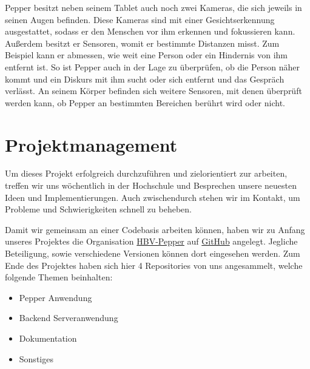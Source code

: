 Pepper besitzt neben seinem Tablet auch noch zwei Kameras, die sich jeweils in seinen Augen befinden. Diese Kameras sind mit einer Gesichtserkennung ausgestattet, sodass er den Menschen vor ihm erkennen und fokussieren kann. Außerdem besitzt er Sensoren, womit er bestimmte Distanzen misst. Zum Beispiel kann er abmessen, wie weit eine Person oder ein Hindernis von ihm entfernt ist. So ist Pepper auch in der Lage zu überprüfen, ob die Person näher kommt und ein Diskurs mit ihm sucht oder sich entfernt und das Gespräch verlässt. 
An seinem Körper befinden sich weitere Sensoren, mit denen überprüft werden kann, ob Pepper an bestimmten Bereichen berührt wird oder nicht.\\


%
%
%
%

\section{Projektmanagement}
Um dieses Projekt erfolgreich durchzuführen und zielorientiert zur arbeiten, treffen wir uns wöchentlich
in der Hochschule und Besprechen unsere neuesten Ideen und Implementierungen. Auch zwischendurch
stehen wir im Kontakt, um Probleme und Schwierigkeiten schnell zu beheben.

Damit wir gemeinsam an einer Codebasis arbeiten können, haben wir zu Anfang unseres Projektes
die Organisation \href{https://github.com/ProjectPepperHSB}{HBV-Pepper} auf
\href{https://github.com}{GitHub} angelegt. Jegliche Beteiligung, sowie verschiedene Versionen können dort eingesehen werden.
Zum Ende des Projektes haben sich hier 4 Repositories von uns angesammelt, welche folgende Themen beinhalten:
\begin{itemize}
    \item Pepper Anwendung
    \item Backend Serveranwendung
    \item Dokumentation
    \item Sonstiges
\end{itemize}

